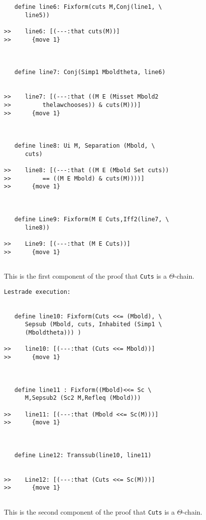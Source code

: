 \documentclass[12pt]{article}
\begin{document}
\begin{verbatim}
   define line6: Fixform(cuts M,Conj(line1, \
      line5))

>>    line6: [(---:that cuts(M))]
>>      {move 1}



   define line7: Conj(Simp1 Mboldtheta, line6)


>>    line7: [(---:that ((M E (Misset Mbold2
>>         thelawchooses)) & cuts(M)))]
>>      {move 1}



   define line8: Ui M, Separation (Mbold, \
      cuts)

>>    line8: [(---:that ((M E (Mbold Set cuts))
>>         == ((M E Mbold) & cuts(M))))]
>>      {move 1}



   define Line9: Fixform(M E Cuts,Iff2(line7, \
      line8))

>>    Line9: [(---:that (M E Cuts))]
>>      {move 1}


\end{verbatim}

This is the first component of the proof that {\tt Cuts} is a $\Theta$-chain.

\begin{verbatim}Lestrade execution:


   define line10: Fixform(Cuts <<= (Mbold), \
      Sepsub (Mbold, cuts, Inhabited (Simp1 \
      (Mboldtheta))) )

>>    line10: [(---:that (Cuts <<= Mbold))]
>>      {move 1}



   define line11 : Fixform((Mbold)<<= Sc \
      M,Sepsub2 (Sc2 M,Refleq (Mbold)))

>>    line11: [(---:that (Mbold <<= Sc(M)))]
>>      {move 1}



   define Line12: Transsub(line10, line11)


>>    Line12: [(---:that (Cuts <<= Sc(M)))]
>>      {move 1}


\end{verbatim}

This is the second component of the proof that {\tt Cuts} is a $\Theta$-chain.
\end{document}
